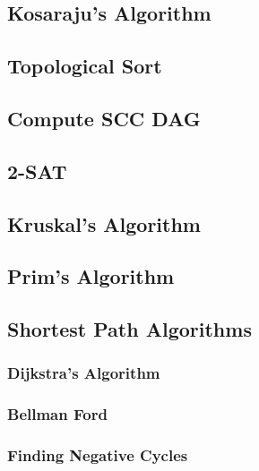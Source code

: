 \documentclass[11pt, letterpaper]{article}
\begin{document}
\subsection{Kosaraju's Algorithm}


\subsection{Topological Sort}


\subsection{Compute SCC DAG}


\subsection{2-SAT}


\subsection{Kruskal's Algorithm}


\subsection{Prim's Algorithm}


\subsection{Shortest Path Algorithms}
\subsubsection{Dijkstra's Algorithm}


\subsubsection{Bellman Ford}


\subsubsection{Finding Negative Cycles}

\end{document}
